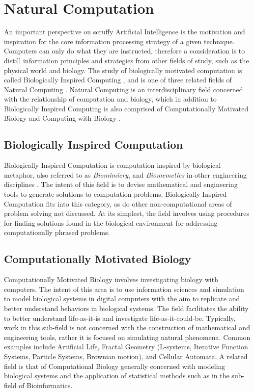 \documentclass[a4paper, 11pt]{article}
\begin{document}
\section{Natural Computation}
\label{sec:natural_computation}
An important perspective on scruffy Artificial Intelligence is the motivation and inspiration for the core information processing strategy of a given technique. Computers can only do what they are instructed, therefore a consideration is to distill information principles and strategies from other fields of study, such as the physical world and biology. The study of biologically motivated computation is called Biologically Inspired Computing \cite{Castro2005a}, and is one of three related fields of Natural Computing \cite{Forbes2000, Forbes2005, Paton1994}. 
Natural Computing is an interdisciplinary field concerned with the relationship of computation and biology, which in addition to Biologically Inspired Computing is also comprised of Computationally Motivated Biology and Computing with Biology \cite{Paun2005, Marrow2000}.

\subsection{Biologically Inspired Computation}
Biologically Inspired Computation is computation inspired by biological metaphor, also referred to as \emph{Biomimicry}, and \emph{Biomemetics} in other engineering disciplines \cite{Castro2005, Benyus1998}. The intent of this field is to devise mathematical and engineering tools to generate solutions to computation problems. Biologically Inspired Computation fits into this category, as do other non-computational areas of problem solving not discussed. At its simplest, the field involves using procedures for finding solutions found in the biological environment for addressing computationally phrased problems.

\subsection{Computationally Motivated Biology}
Computationally Motivated Biology involves investigating biology with computers. The intent of this area is to use information sciences and simulation to model biological systems in digital computers with the aim to replicate and better understand behaviors in biological systems. The field facilitates the ability to better understand life-as-it-is and investigate life-as-it-could-be. Typically, work in this sub-field is not concerned with the construction of mathematical and engineering tools, rather it is focused on simulating natural phenomena. Common examples include Artificial Life, Fractal Geometry (L-systems, Iterative Function Systems, Particle Systems, Brownian motion), and Cellular Automata. A related field is that of Computational Biology generally concerned with modeling biological systems and the application of statistical methods such as in the sub-field of Bioinformatics.
\end{document}
